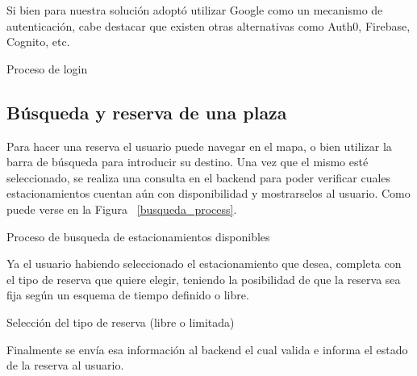 Si bien para nuestra solución adoptó utilizar Google como un mecanismo de autenticación, cabe destacar que existen otras alternativas como Auth0, Firebase, Cognito, etc.

\begin{images}[\label{login_process}]{Proceso de login}
\end{images}

\subsection{Búsqueda y reserva de una plaza}
Para hacer una reserva el usuario puede navegar en el mapa, o bien utilizar la barra de búsqueda para introducir su destino. Una vez que el mismo esté seleccionado, se realiza una consulta en el backend para poder verificar cuales estacionamientos cuentan aún con disponibilidad y mostrarselos al usuario. Como puede verse en la Figura ~\ref{busqueda_process}.

\begin{images}[\label{busqueda_process}]{Proceso de busqueda de estacionamientos disponibles}
\end{images}

Ya el usuario habiendo seleccionado el estacionamiento que desea, completa con el tipo de reserva que quiere elegir, teniendo la posibilidad de que la reserva sea fija según un esquema de tiempo definido o libre.

\begin{images}[\label{reserva_process}]{Selección del tipo de reserva (libre o limitada)}
\end{images}

Finalmente se envía esa información al backend el cual valida e informa el estado de la reserva al usuario.

